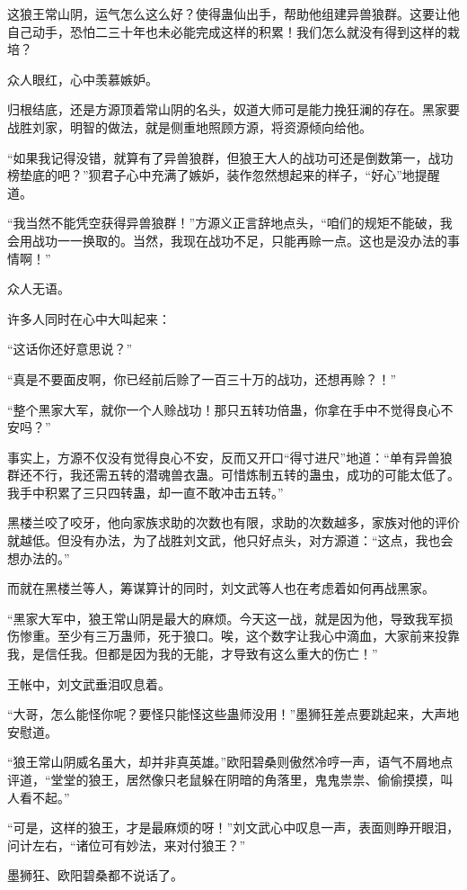 \begin{this_body}
这狼王常山阴，运气怎么这么好？使得蛊仙出手，帮助他组建异兽狼群。这要让他自己动手，恐怕二三十年也未必能完成这样的积累！我们怎么就没有得到这样的栽培？

众人眼红，心中羡慕嫉妒。

归根结底，还是方源顶着常山阴的名头，奴道大师可是能力挽狂澜的存在。黑家要战胜刘家，明智的做法，就是侧重地照顾方源，将资源倾向给他。

“如果我记得没错，就算有了异兽狼群，但狼王大人的战功可还是倒数第一，战功榜垫底的吧？”狈君子心中充满了嫉妒，装作忽然想起来的样子，“好心”地提醒道。

“我当然不能凭空获得异兽狼群！”方源义正言辞地点头，“咱们的规矩不能破，我会用战功一一换取的。当然，我现在战功不足，只能再赊一点。这也是没办法的事情啊！”

众人无语。

许多人同时在心中大叫起来：

“这话你还好意思说？”

“真是不要面皮啊，你已经前后赊了一百三十万的战功，还想再赊？！”

“整个黑家大军，就你一个人赊战功！那只五转功倍蛊，你拿在手中不觉得良心不安吗？”

事实上，方源不仅没有觉得良心不安，反而又开口“得寸进尺”地道：“单有异兽狼群还不行，我还需五转的潜魂兽衣蛊。可惜炼制五转的蛊虫，成功的可能太低了。我手中积累了三只四转蛊，却一直不敢冲击五转。”

黑楼兰咬了咬牙，他向家族求助的次数也有限，求助的次数越多，家族对他的评价就越低。但没有办法，为了战胜刘文武，他只好点头，对方源道：“这点，我也会想办法的。”

而就在黑楼兰等人，筹谋算计的同时，刘文武等人也在考虑着如何再战黑家。

“黑家大军中，狼王常山阴是最大的麻烦。今天这一战，就是因为他，导致我军损伤惨重。至少有三万蛊师，死于狼口。唉，这个数字让我心中滴血，大家前来投靠我，是信任我。但都是因为我的无能，才导致有这么重大的伤亡！”

王帐中，刘文武垂泪叹息着。

“大哥，怎么能怪你呢？要怪只能怪这些蛊师没用！”墨狮狂差点要跳起来，大声地安慰道。

“狼王常山阴威名虽大，却并非真英雄。”欧阳碧桑则傲然冷哼一声，语气不屑地点评道，“堂堂的狼王，居然像只老鼠躲在阴暗的角落里，鬼鬼祟祟、偷偷摸摸，叫人看不起。”

“可是，这样的狼王，才是最麻烦的呀！”刘文武心中叹息一声，表面则睁开眼泪，问计左右，“诸位可有妙法，来对付狼王？”

墨狮狂、欧阳碧桑都不说话了。


\end{this_body}
